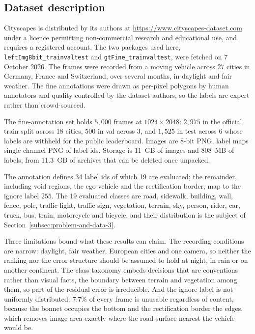 \subsection{Dataset description}
\label{subsec:problem-and-data-2}

Cityscapes \cite{cordts2016cityscapes} is distributed by its authors at
\url{https://www.cityscapes-dataset.com} under a licence permitting non-commercial research and
educational use, and requires a registered account. The two packages used here,
\texttt{leftImg8bit\_trainvaltest} and \texttt{gtFine\_trainvaltest}, were fetched on 7 October
2026. The frames were recorded from a moving vehicle across 27 cities in Germany, France and
Switzerland, over several months, in daylight and fair weather. The fine annotations were drawn
as per-pixel polygons by human annotators and quality-controlled by the dataset authors, so the
labels are expert rather than crowd-sourced.

The fine-annotation set holds $5{,}000$ frames at $1024 \times 2048$: $2{,}975$ in the official
train split across 18 cities, $500$ in val across 3, and $1{,}525$ in test across 6 whose labels
are withheld for the public leaderboard. Images are 8-bit PNG, label maps single-channel PNG of
label ids. Storage is 11~GB of images and 808~MB of labels, from 11.3~GB of archives that can be
deleted once unpacked.

The annotation defines 34 label ids of which 19 are evaluated; the remainder, including void
regions, the ego vehicle and the rectification border, map to the ignore label $255$. The 19
evaluated classes are road, sidewalk, building, wall, fence, pole, traffic light, traffic sign,
vegetation, terrain, sky, person, rider, car, truck, bus, train, motorcycle and bicycle, and
their distribution is the subject of Section~\ref{subsec:problem-and-data-3}.

Three limitations bound what these results can claim. The recording conditions are narrow:
daylight, fair weather, European cities and one camera, so neither the ranking nor the error
structure should be assumed to hold at night, in rain or on another continent. The class
taxonomy embeds decisions that are conventions rather than visual facts, the boundary between
terrain and vegetation among them, so part of the residual error is irreducible. And the ignore
label is not uniformly distributed: $7.7\%$ of every frame is unusable regardless of content,
because the bonnet occupies the bottom and the rectification border the edges, which removes
image area exactly where the road surface nearest the vehicle would be.

